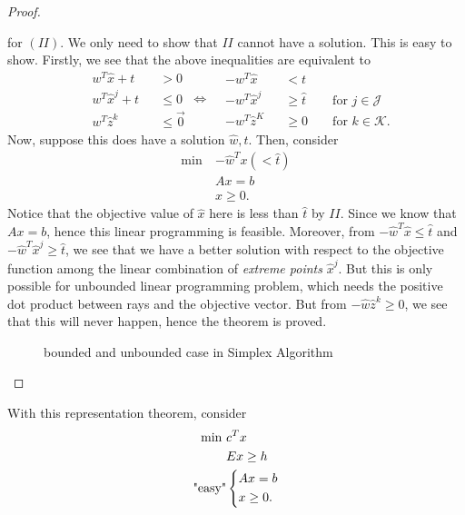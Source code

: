 \begin{proof}
\begin{enumerate}
\[		      \]
		      for \((II)\). We only need to show that \(II\) cannot have a solution. This is easy to show. Firstly,
		      we see that the above inequalities are equivalent to
		      \[
			      \begin{alignedat}{3}
				      &w^{T}\hat{x}+t&&>0\\
				      &w^{T}\hat{x}^j + t&&\leq 0\\
				      &w^{T}\hat{z}^k &&\leq \vec{0}
			      \end{alignedat}\iff\begin{alignedat}{3}
				      &-w^{T}\hat{x}&&<t\\
				      &-w^{T}\hat{x}^j &&\geq \hat{t} &&\text{ for }j\in\mathcal{J}\\
				      &-w^{T}\hat{z}^K &&\geq 0 &&\text{ for }k\in\mathcal{K}.
			      \end{alignedat}
		      \]
		      Now, suppose this does have a solution \(\hat{w}, \hat{t}\). Then, consider
		      \begin{align*}
			      \min~ & -\hat{w}^{T}x(<\hat{t}) \\
			            & Ax = b                  \\
			            & x\geq 0.
		      \end{align*}
		      Notice that the objective value of \(\hat{x}\) here is less than \(\hat{t}\) by \(II\). Since we know that
		      \(Ax = b\), hence this linear programming is feasible. Moreover, from \(-\hat{w}^{T}\hat{x}\leq \hat{t}\) and
		      \(-\hat{w}^{T}\hat{x}^j\geq \hat{t}\), we see that we have a better solution with respect to the objective function
		      among the linear combination of \emph{extreme points} \(\hat{x}^j\). But this is only possible for unbounded linear
		      programming problem, which needs the positive dot product between rays and the objective vector. But from
		      \(-\hat{w}\hat{z}^k\geq 0\), we see that this will never happen, hence the theorem is proved.
		      \begin{figure}[H]
			      \centering
			      \caption{bounded and unbounded case in Simplex Algorithm}
			      \label{fig:representation-theorem}
		      \end{figure}
	\end{enumerate}
\end{proof}

With this representation theorem, consider
\begin{align*}
	\min~         & c^Tx          \\
	              & Ex\geq h      \\
	\text{"easy"} & \begin{dcases}
		                Ax = b \\
		                x\geq 0.
	                \end{dcases}
\end{align*}

